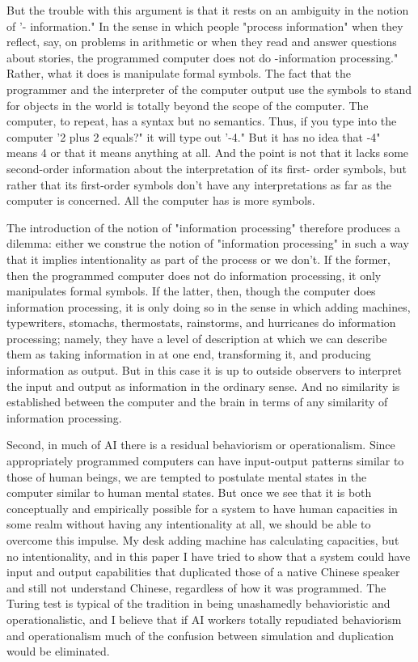 But the trouble with this argument is that it rests on an ambiguity in the notion of '- information." In the sense in
which people "process information" when they reflect, say, on problems in arithmetic or when they read and
answer questions about stories, the programmed computer does not do -information processing." Rather, what
it does is manipulate formal symbols. The fact that the programmer and the interpreter of the computer output
use the symbols to stand for objects in the world is totally beyond the scope of the computer. The computer, to
repeat, has a syntax but no semantics. Thus, if you type into the computer '2 plus 2 equals?" it will type out '-4."
But it has no idea that -4" means 4 or that it means anything at all. And the point is not that it lacks some
second-order information about the interpretation of its first- order symbols, but rather that its first-order
symbols don't have any interpretations as far as the computer is concerned. All the computer has is more
symbols.

The introduction of the notion of "information processing" therefore produces a dilemma: either we construe the
notion of "information processing" in such a way that it implies intentionality as part of the process or we don't. If
the former, then the programmed computer does not do information processing, it only manipulates formal
symbols. If the latter, then, though the computer does information processing, it is only doing so in the sense in
which adding machines, typewriters, stomachs, thermostats, rainstorms, and hurricanes do information
processing; namely, they have a level of description at which we can describe them as taking information in at
one end, transforming it, and producing information as output. But in this case it is up to outside observers to
interpret the input and output as information in the ordinary sense. And no similarity is established between the
computer and the brain in terms of any similarity of information processing.

Second, in much of AI there is a residual behaviorism or operationalism. Since appropriately programmed
computers can have input-output patterns similar to those of human beings, we are tempted to postulate mental
states in the computer similar to human mental states. But once we see that it is both conceptually and
empirically possible for a system to have human capacities in some realm without having any intentionality at all,
we should be able to overcome this impulse. My desk adding machine has calculating capacities, but no
intentionality, and in this paper I have tried to show that a system could have input and output capabilities that
duplicated those of a native Chinese speaker and still not understand Chinese, regardless of how it was
programmed. The Turing test is typical of the tradition in being unashamedly behavioristic and operationalistic,
and I believe that if AI workers totally repudiated behaviorism and operationalism much of the confusion
between simulation and duplication would be eliminated.

